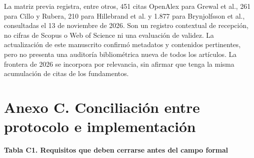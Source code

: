 \documentclass[12pt,letterpaper]{article}
\begin{document}
La matriz previa registra, entre otros, 451 citas OpenAlex para Grewal et al., 261 para Cillo y Rubera, 210 para Hillebrand et al. y 1.877 para Brynjolfsson et al., consultadas el 13 de noviembre de 2026. Son un registro contextual de recepción, no cifras de Scopus o Web of Science ni una evaluación de validez. La actualización de este manuscrito confirmó metadatos y contenidos pertinentes, pero no presenta una auditoría bibliométrica nueva de todos los artículos. La frontera de 2026 se incorpora por relevancia, sin afirmar que tenga la misma acumulación de citas de los fundamentos.

\clearpage
\section*{Anexo C. Conciliación entre protocolo e implementación}
\noindent \textbf{Tabla C1. Requisitos que deben cerrarse antes del campo formal}\par\nopagebreak
\end{document}
